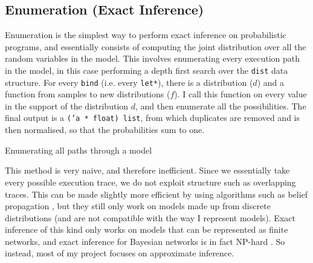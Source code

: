 		
		
		
		
\subsection{Enumeration (Exact Inference)} \label{sec:enum}
Enumeration is the simplest way to perform exact inference on probabilistic programs, and essentially consists of computing the joint distribution over all the random variables in the model. This involves enumerating every execution path in the model, in this case performing a depth first search over the \texttt{dist} data structure. For every \texttt{bind} (i.e. every \texttt{let*}), there is a distribution ($d$) and a function from samples to new distributions ($f$). I call this function on every value in the support of the distribution $d$, and then enumerate all the possibilities. The final output is a \texttt{('a * float) list}, from which duplicates are removed and is then normalised, so that the probabilities sum to one.
		
\begin{listing}[ht]
	\caption{Enumerating all paths through a model}
	\label{lst:enum}
\end{listing}
		
This method is very naive, and therefore inefficient. Since we essentially take every possible execution trace, we do not exploit structure such as overlapping traces. This can be made slightly more efficient by using algorithms such as belief propagation \cite{belief-prop}, but they still only work on models made up from discrete distributions (and are not compatible with the way I represent models). Exact inference of this kind only works on models that can be represented as finite networks, and exact inference for Bayesian networks is in fact NP-hard \cite{cooper1990computational}. So instead, most of my project focuses on approximate inference.
		
